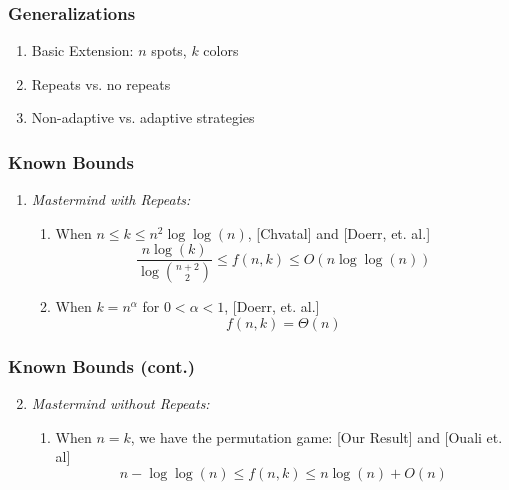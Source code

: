 \documentclass{beamer}
\begin{document}
    \begin{frame}
    	\frametitle{Generalizations}
		\begin{enumerate}[label=\roman*.]
		\item Basic Extension: $n$ spots, $k$ colors
		\item Repeats vs. no repeats
		\item Non-adaptive vs. adaptive strategies
		\end{enumerate}
    \end{frame}

    \begin{frame}
    	\frametitle{Known Bounds}
		\begin{enumerate}[label=\arabic*.]
		\item\textit{Mastermind with Repeats:}
    		\begin{enumerate}[label=\roman*.]
    		\item When $n\le k \le n^2\log\log(n)$, [Chvatal] and [Doerr, et. al.]
    			\begin{equation*}
    			\frac{n\log(k)}{\log\binom{n+2}{2}}\le f(n, k)\le O(n\log\log(n))
    			\end{equation*}
    		\item When $k=n^{\alpha}$ for $0<\alpha<1$, [Doerr, et. al.]
    			\begin{equation*}
    			f(n, k) = \Theta(n)
    			\end{equation*}
    		\end{enumerate}
		\end{enumerate}
	\end{frame}
	
	\begin{frame}
	\frametitle{Known Bounds (cont.)}
		\begin{enumerate}[label=\arabic*.]
		\setcounter{enumi}{1}
    	\item\textit{Mastermind without Repeats:} 
    		\begin{enumerate}[label=\roman*.]
    		\item When $n=k$, we have the permutation game:
			[Our Result] and [Ouali et. al]
    			\begin{equation*}
    			n - \log\log(n) \le f(n, k)\le n\log(n) + O(n)
    			\end{equation*}
    		\end{enumerate}
	\end{enumerate}
    \end{frame}
    
\end{document}
